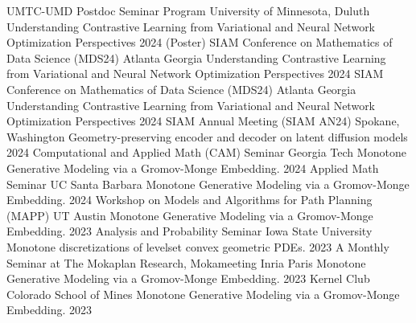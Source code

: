 

\begin{cvtalks}

\cvtalk
    {UMTC-UMD Postdoc Seminar Program} %
    {University of Minnesota, Duluth}
    {Understanding Contrastive Learning from Variational and Neural Network Optimization Perspectives} %
    {2024} %
\cvtalk
    {(Poster) SIAM Conference on Mathematics of Data Science (MDS24)} %
    {Atlanta Georgia}
    {Understanding Contrastive Learning from Variational and Neural Network Optimization Perspectives} %
    {2024} %
\cvtalk
    {SIAM Conference on Mathematics of Data Science (MDS24)} %
    {Atlanta Georgia}
    { Understanding Contrastive Learning from Variational and Neural Network Optimization Perspectives} %
    {2024} %
\cvtalk
    {SIAM Annual Meeting (SIAM AN24)} %
    {Spokane, Washington}
    {Geometry-preserving encoder and decoder on latent diffusion models} %
    {2024} %
\cvtalk
    {Computational and Applied Math (CAM) Seminar} %
    {Georgia Tech}
    {Monotone Generative Modeling via a Gromov-Monge Embedding.} %
    {2024} %
\cvtalk
    {Applied Math Seminar} %
    {UC Santa Barbara}
    {Monotone Generative Modeling via a Gromov-Monge Embedding.} %
    {2024} %
\cvtalk
    {Workshop on Models and Algorithms for Path Planning (MAPP)} %
    {UT Austin}
    {Monotone Generative Modeling via a Gromov-Monge Embedding.} %
    {2023} %
\cvtalk
    {Analysis and Probability Seminar}
    {Iowa State University}
    {Monotone discretizations of levelset convex geometric PDEs.}
    {2023}
\cvtalk
    {A Monthly Seminar at The Mokaplan Research, Mokameeting} %
    {Inria Paris}
    {Monotone Generative Modeling via a Gromov-Monge Embedding.} %
    {2023} %
\cvtalk
    {Kernel Club} %
    {Colorado School of Mines}
    {Monotone Generative Modeling via a Gromov-Monge Embedding.} %
    {2023} %


\end{cvtalks}
